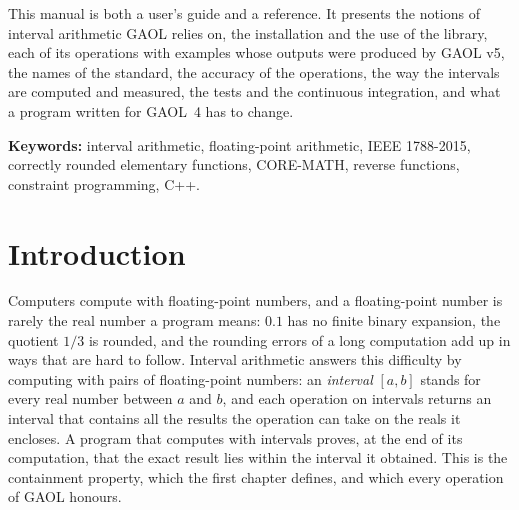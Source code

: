 \documentclass[12pt,a4paper,twoside,openright]{book}
\begin{document}
\medskip
\noindent
This manual is both a user's guide and a reference. It presents the notions
of interval arithmetic GAOL relies on, the installation and the use of the
library, each of its operations with examples whose outputs were produced by
GAOL v5, the names of the standard, the accuracy of the operations, the way
the intervals are computed and measured, the tests and the continuous
integration, and what a program written for GAOL~4 has to change.

\bigskip
\noindent\textbf{Keywords:} interval arithmetic, floating-point arithmetic,
IEEE 1788-2015, correctly rounded elementary functions, CORE-MATH, reverse
functions, constraint programming, C++.

\tableofcontents
\listoftables

\mainmatter
\pagestyle{YO}

\chapter*{Introduction}\label{chap:introduction}
\pagestyle{INTRO}
\thispagestyle{plain}

Computers compute with floating-point numbers, and a floating-point number
is rarely the real number a program means: $0.1$ has no finite binary
expansion, the quotient $1/3$ is rounded, and the rounding errors of a long
computation add up in ways that are hard to follow. Interval arithmetic
answers this difficulty by computing with pairs of floating-point numbers:
an \emph{interval} $[a, b]$ stands for every real number between $a$ and
$b$, and each operation on intervals returns an interval that contains all
the results the operation can take on the reals it encloses. A program that
computes with intervals proves, at the end of its computation, that the
exact result lies within the interval it obtained. This is the containment
property, which the first chapter defines, and which every operation of GAOL
honours.
\end{document}
